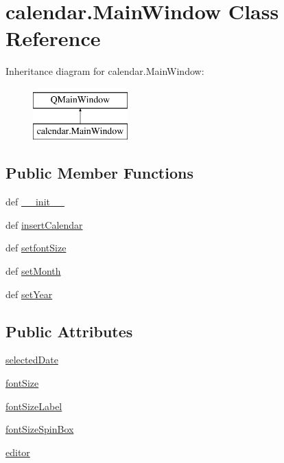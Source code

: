 \hypertarget{classcalendar_1_1MainWindow}{}\section{calendar.\+Main\+Window Class Reference}
\label{classcalendar_1_1MainWindow}
Inheritance diagram for calendar.\+Main\+Window\+:\begin{figure}[H]
\begin{center}
\leavevmode
\includegraphics[height=2.000000cm]{classcalendar_1_1MainWindow}
\end{center}
\end{figure}
\subsection*{Public Member Functions}
\begin{DoxyCompactItemize}
\item 
def \hyperlink{classcalendar_1_1MainWindow_af381c8ebb9a88f9614ebab097d3ebe93}{\+\_\+\+\_\+init\+\_\+\+\_\+}
\item 
def \hyperlink{classcalendar_1_1MainWindow_a1013881f578accca23e908e8841105e1}{insert\+Calendar}
\item 
def \hyperlink{classcalendar_1_1MainWindow_a13b3560dfe97122853ae48de3d1d855b}{setfont\+Size}
\item 
def \hyperlink{classcalendar_1_1MainWindow_aeefc5e14d9d51b4573b464a64c1141f9}{set\+Month}
\item 
def \hyperlink{classcalendar_1_1MainWindow_afe46d1ac87a43972182575331c6af163}{set\+Year}
\end{DoxyCompactItemize}
\subsection*{Public Attributes}
\begin{DoxyCompactItemize}
\item 
\hyperlink{classcalendar_1_1MainWindow_ad5fd9491f07a610973de49cd835bf035}{selected\+Date}
\item 
\hyperlink{classcalendar_1_1MainWindow_aa85ad4b184af97d2f790874300fbc4db}{font\+Size}
\item 
\hyperlink{classcalendar_1_1MainWindow_aa58796607b886bb623c64a934ae8857d}{font\+Size\+Label}
\item 
\hyperlink{classcalendar_1_1MainWindow_a820c6b2c2b916f902ab33d32200be906}{font\+Size\+Spin\+Box}
\item 
\hyperlink{classcalendar_1_1MainWindow_a4f903d694754bbe15a346673aa7633ba}{editor}
\end{DoxyCompactItemize}


